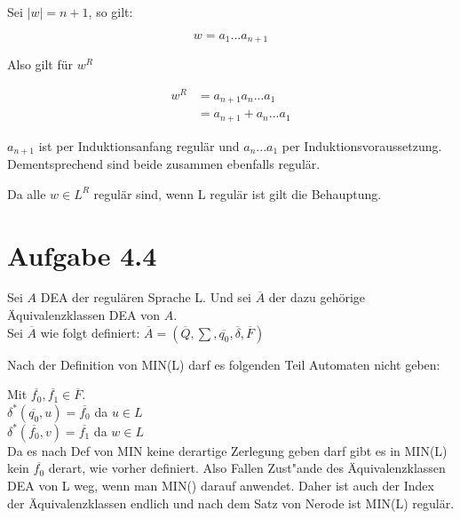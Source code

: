 \documentclass[12pt, a4paper]{article}
\begin{document}
Sei $\mid w \mid = n + 1$, so gilt:

\begin{equation}
w = a_1 ... a_{n+1}
\end{equation}

Also gilt für $w^R$

\begin{equation}
\begin{split}
w^R &= a_{n+1} a_n ... a_1 \\
&= a_{n+1} + a_n ... a_1
\end{split}
\end{equation}

$a_{n+1}$ ist per Induktionsanfang regulär und $ a_n ... a_1$ per Induktionsvoraussetzung. Dementsprechend sind beide zusammen ebenfalls regulär.

Da alle $w \in L^R$ regulär sind, wenn L regulär ist gilt die Behauptung.

\section*{Aufgabe 4.4}

Sei $A$ DEA der regul\"aren Sprache L.
Und sei $\overline{A}$ der dazu geh\"orige \"Aquivalenzklassen DEA von $A$.\\
Sei $\overline{A}$ wie folgt definiert:
$\overline{A} = ( \overline{Q}, \sum , \overline{q_0}, \overline{\delta}, \overline{F})$

Nach der Definition von MIN(L) darf es folgenden Teil Automaten nicht geben:


Mit $\overline{f_0} , \overline{f_1} \in \overline{F}$.\\
$\delta^*(\overline{q_0}, u) = \overline{f_0}$ \hfill da $u \in L$ \\
$\delta^*(\overline{f_0}, v) = \overline{f_1}$ \hfill da $w \in L$ \\

Da es nach Def von MIN keine derartige Zerlegung geben darf gibt es in MIN(L) kein $\overline{f_0}$ derart, wie vorher definiert. Also Fallen Zust"ande des \"Aquivalenzklassen DEA von L weg, wenn man MIN() darauf anwendet. Daher ist auch der Index der \"Aquivalenzklassen endlich und nach dem Satz von Nerode ist MIN(L) regul\"ar. 
\end{document}
